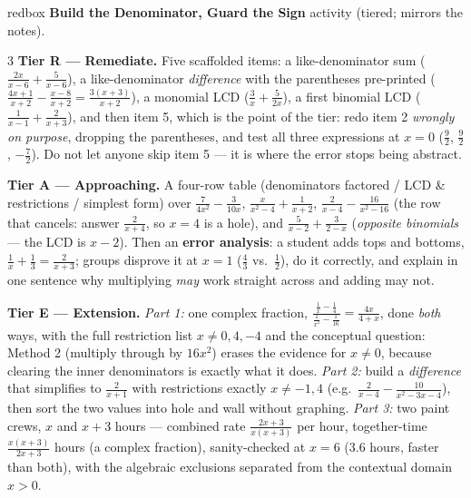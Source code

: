 \documentclass[10pt]{article}
\begin{document}
\begin{skillbox}{redbox}
\textbf{Build the Denominator, Guard the Sign} activity (tiered; mirrors the notes).
\begin{multicols}{3}
\textbf{Tier R --- Remediate.} Five scaffolded items: a like-denominator sum
($\frac{2x}{x-6}+\frac{5}{x-6}$), a like-denominator \emph{difference} with the parentheses pre-printed
($\frac{4x+1}{x+2}-\frac{x-8}{x+2}=\frac{3(x+3)}{x+2}$), a monomial LCD ($\frac3x+\frac{5}{2x}$), a
first binomial LCD ($\frac{1}{x-1}+\frac{2}{x+3}$), and then item 5, which is the point of the tier:
redo item 2 \emph{wrongly on purpose}, dropping the parentheses, and test all three expressions at
$x=0$ ($\frac92$, $\frac92$, $-\frac72$). Do not let anyone skip item 5 --- it is where the error stops
being abstract.

\columnbreak
\textbf{Tier A --- Approaching.} A four-row table (denominators factored / LCD \& restrictions /
simplest form) over $\frac{7}{4x^2}-\frac{3}{10x}$, $\frac{x}{x^2-4}+\frac{1}{x+2}$,
$\frac{2}{x-4}-\frac{16}{x^2-16}$ (the row that cancels: answer $\frac{2}{x+4}$, so $x=4$ is a hole),
and $\frac{5}{x-2}+\frac{3}{2-x}$ (\emph{opposite binomials} --- the LCD is $x-2$). Then an
\textbf{error analysis}: a student adds tops and bottoms, $\frac1x+\frac13=\frac{2}{x+3}$; groups
disprove it at $x=1$ ($\frac43$ vs.\ $\frac12$), do it correctly, and explain in one sentence why
multiplying \emph{may} work straight across and adding may not.

\columnbreak
\textbf{Tier E --- Extension.} \emph{Part 1:} one complex fraction,
$\frac{\frac1x-\frac14}{\frac{1}{x^2}-\frac{1}{16}}=\frac{4x}{4+x}$, done \emph{both} ways, with the
full restriction list $x\neq0,4,-4$ and the conceptual question: Method 2 (multiply through by $16x^2$)
erases the evidence for $x\neq0$, because clearing the inner denominators is exactly what it does.
\emph{Part 2:} build a \emph{difference} that simplifies to $\frac{2}{x+1}$ with restrictions exactly
$x\neq-1,4$ (e.g.\ $\frac{2}{x-4}-\frac{10}{x^2-3x-4}$), then sort the two values into hole and wall
without graphing. \emph{Part 3:} two paint crews, $x$ and $x+3$ hours --- combined rate
$\frac{2x+3}{x(x+3)}$ per hour, together-time $\frac{x(x+3)}{2x+3}$ hours (a complex fraction),
sanity-checked at $x=6$ ($3.6$ hours, faster than both), with the algebraic exclusions separated from
the contextual domain $x>0$.
\end{multicols}
\end{skillbox}
\end{document}
